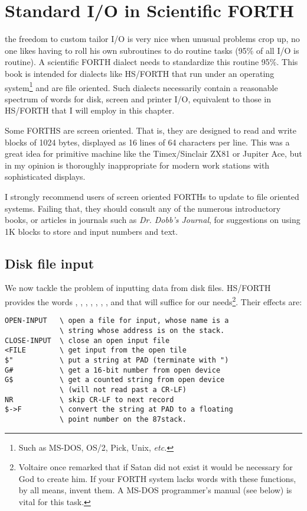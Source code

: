 \section{Standard I/O in Scientific FORTH}

 the freedom to custom tailor I/O is very nice when unusual problems crop up, no one likes having to roll his own subroutines to do routine tasks (95\% of all I/O is routine).
A scientific FORTH dialect needs to standardize this routine 95\%.
This book is intended for dialects like HS/FORTH that run under an operating system\footnote{Such as MS-DOS, OS/2, Pick, Unix, \textit{etc.}} and are file oriented.
Such dialects necessarily contain a reasonable spectrum of words for disk, screen and printer I/O, equivalent to those in HS/FORTH that I will employ in this chapter.

Some FORTHS are screen oriented.
That is, they are designed to read and write blocks of 1024 bytes, displayed as 16 lines of 64 characters per line.
This was a great idea for primitive machine like the Timex/Sinclair ZX81 or Jupiter Ace, but in my opinion is thoroughly inappropriate for modern work stations with sophisticated displays.

I strongly recommend users of screen oriented FORTHs to update to file oriented systems.
Failing that, they should consult any of the numerous introductory books, or articles in journals such as \textit{Dr. Dobb's Journal}, for suggestions on using 1K blocks to store and input numbers and text.

\subsection{Disk file input}
We now tackle the problem of inputting data from disk files.
HS/FORTH provides the words , , , , , , , and  that will suffice for
our needs\footnote{Voltaire once remarked that if Satan did not exist it would be necessary for God to create him. If your FORTH system lacks words with these functions, by all means, invent them. A MS-DOS programmer's manual (see below) is vital for this task.}.
Their effects are:

\begin{lstlisting}
OPEN-INPUT   \ open a file for input, whose name is a
             \ string whose address is on the stack.
CLOSE-INPUT  \ close an open input file
<FILE        \ get input from the open tile
$"           \ put a string at PAD (terminate with ")
G#           \ get a 16-bit number from open device
G$           \ get a counted string from open device
             \ (will not read past a CR-LF)
NR           \ skip CR-LF to next record
$->F         \ convert the string at PAD to a floating
             \ point number on the 87stack.
\end{lstlisting}

